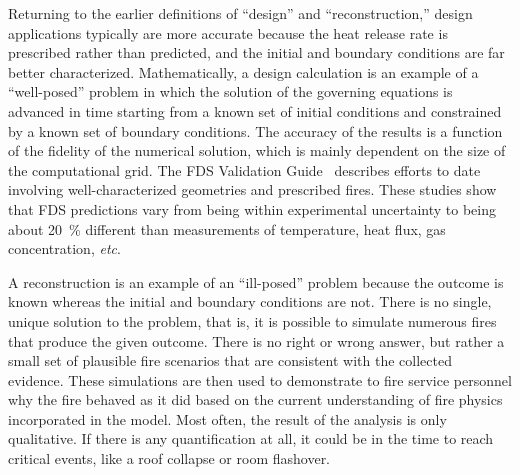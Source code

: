 Returning   to    the   earlier   definitions    of   ``design''   and
``reconstruction,''  design applications  typically are  more accurate
because the heat release rate is prescribed rather than predicted, and
the    initial    and    boundary    conditions   are    far    better
characterized. Mathematically, a design calculation is an example of a
``well-posed''  problem  in  which   the  solution  of  the  governing
equations is  advanced in  time starting from  a known set  of initial
conditions and constrained by a known set of boundary conditions.  The
accuracy of the results is a function of the fidelity of the numerical
solution, which is  mainly dependent on the size  of the computational
grid. The FDS Validation Guide~\cite{FDS_Validation_Guide_5} describes
efforts to date involving well-characterized geometries and prescribed
fires. These studies show that  FDS predictions vary from being within
experimental   uncertainty  to  being   about  20~\%   different  than
measurements of temperature, heat flux, gas concentration, {\em etc}.

A reconstruction is an example of an ``ill-posed'' problem because the
outcome  is known  whereas  the initial  and  boundary conditions  are
not. There is  no single, unique solution to the  problem, that is, it
is possible to simulate numerous fires that produce the given outcome.
There is no right or wrong answer, but rather a small set of plausible
fire scenarios that are  consistent with the collected evidence. These
simulations are then used to demonstrate to fire service personnel why
the fire behaved as it did  based on the current understanding of fire
physics  incorporated in  the model.  Most  often, the  result of  the
analysis is only  qualitative. If there is any  quantification at all,
it could be in the time to reach critical events, like a roof collapse
or room flashover.
